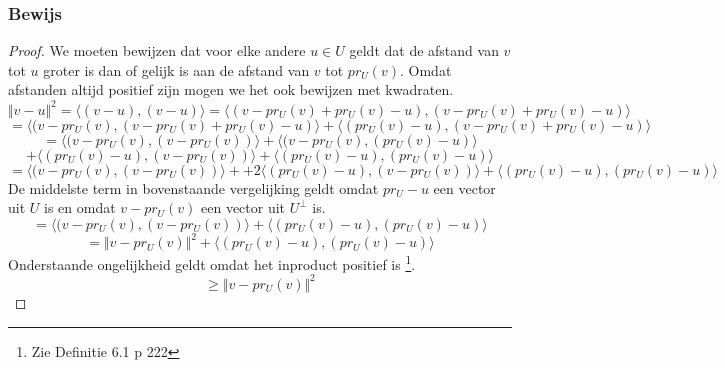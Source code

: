 \documentclass[lineaire_algebra_oplossingen.tex]{subfiles}
\begin{document}
\subsubsection*{Bewijs}
\begin{proof}
We moeten bewijzen dat voor elke andere $u\in U$ geldt dat de afstand van $v$ tot $u$ groter is dan of gelijk is aan de afstand van $v$ tot $pr_U(v)$. Omdat afstanden altijd positief zijn mogen we het ook bewijzen met kwadraten.
\[
\Vert v- u \Vert^2 = \langle (v-u) , (v-u)\rangle = \langle (v-pr_U(v)+pr_U(v)-u) , (v-pr_U(v)+pr_U(v)-u)\rangle
\]
\[
= \langle (v-pr_U(v), (v-pr_U(v)+pr_U(v)-u)\rangle + \langle (pr_U(v)-u) , (v-pr_U(v)+pr_U(v)-u)\rangle
\]
\[
= \langle (v-pr_U(v), (v-pr_U(v))\rangle + \langle (v-pr_U(v), (pr_U(v)-u)\rangle\]\[ +\langle (pr_U(v)-u) , (v-pr_U(v))\rangle + \langle (pr_U(v)-u) , (pr_U(v)-u)\rangle
\]
\[
= \langle (v-pr_U(v), (v-pr_U(v))\rangle + +2\langle (pr_U(v)-u) , (v-pr_U(v))\rangle + \langle (pr_U(v)-u) , (pr_U(v)-u)\rangle
\]
De middelste term in bovenstaande vergelijking geldt omdat $pr_U-u$ een vector uit $U$ is en omdat $v-pr_U(v)$ een vector uit $U^\bot$ is.
\[
 = \langle (v-pr_U(v), (v-pr_U(v))\rangle + \langle (pr_U(v)-u) , (pr_U(v)-u)\rangle
\]
\[
= \Vert v-pr_U(v) \Vert^2 + \langle (pr_U(v)-u) , (pr_U(v)-u)\rangle
\]
Onderstaande ongelijkheid geldt omdat het inproduct positief is \footnote{Zie Definitie 6.1 p 222}.
\[
\ge \Vert v-pr_U(v) \Vert^2
\]
\end{proof}
\end{document}

